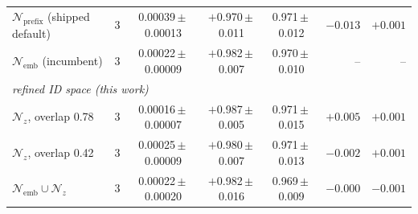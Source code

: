 \begin{table}[t]
\begin{tabular}{lccccrr}
$\mathcal{N}_{\text{prefix}}$ (shipped default) & 3 & 0.00039\,$\pm$\,0.00013 & $+$0.970\,$\pm$\,0.011 & 0.971\,$\pm$\,0.012 & $-0.013$ & $+0.001$ \\
$\mathcal{N}_{\text{emb}}$ (incumbent) & 3 & 0.00022\,$\pm$\,0.00009 & $+$0.982\,$\pm$\,0.007 & 0.970\,$\pm$\,0.010 & -- & -- \\
\midrule
\multicolumn{7}{l}{\textit{refined ID space (this work)}} \\
$\mathcal{N}_z$, overlap 0.78 & 3 & 0.00016\,$\pm$\,0.00007 & $+$0.987\,$\pm$\,0.005 & 0.971\,$\pm$\,0.015 & $+0.005$ & $+0.001$ \\
$\mathcal{N}_z$, overlap 0.42 & 3 & 0.00025\,$\pm$\,0.00009 & $+$0.980\,$\pm$\,0.007 & 0.971\,$\pm$\,0.013 & $-0.002$ & $+0.001$ \\
$\mathcal{N}_{\text{emb}}\cup\mathcal{N}_z$ & 3 & 0.00022\,$\pm$\,0.00020 & $+$0.982\,$\pm$\,0.016 & 0.969\,$\pm$\,0.009 & $-0.000$ & $-0.001$ \\
\bottomrule
\end{tabular}
\end{table}


